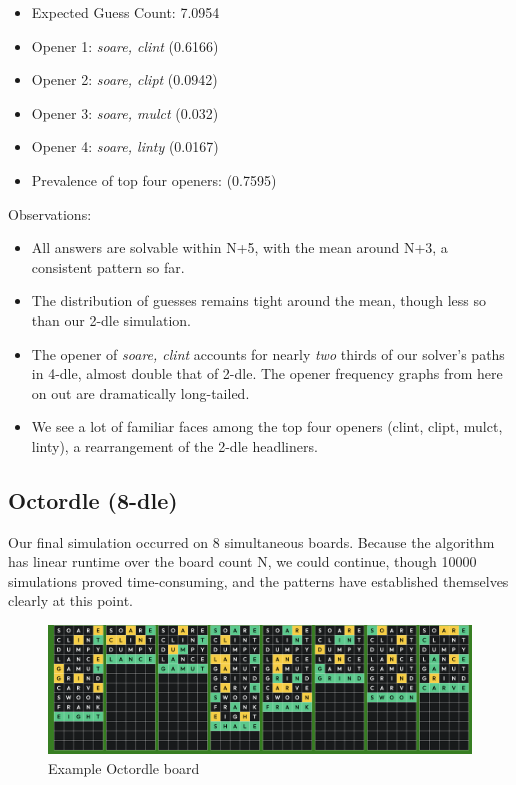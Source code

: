 \documentclass[11pt, oneside]{article} 	%
\begin{document}
\begin{itemize}
\item Expected Guess Count: 7.0954
\item Opener 1: \emph{soare, clint} (0.6166)
\item Opener 2: \emph{soare, clipt} (0.0942)
\item Opener 3: \emph{soare, mulct} (0.032)
\item Opener 4: \emph{soare, linty} (0.0167)
\item Prevalence of top four openers: (0.7595)
\end{itemize}

Observations: 
\begin{itemize}
\item All answers are solvable within N+5, with the mean around N+3, a consistent pattern so far.
\item The distribution of guesses remains tight around the mean, though less so than our 2-dle simulation.
\item The opener of \emph{soare, clint} accounts for nearly \emph{two} thirds of our solver's paths in 4-dle, almost double that of 2-dle. The opener frequency graphs from here on out are dramatically long-tailed.
\item We see a lot of familiar faces among the top four openers (clint, clipt, mulct, linty), a rearrangement of the 2-dle headliners.
\end{itemize}


\subsection{Octordle (8-dle)}

Our final simulation occurred on 8 simultaneous boards. Because the algorithm has linear runtime over the board count N, we could continue, though 10000 simulations proved time-consuming, and the patterns have established themselves clearly at this point. 

\begin{figure}[!htb]
\includegraphics[scale=.33]{octordle}
\caption{Example Octordle board}%
\end{figure}
\end{document}
